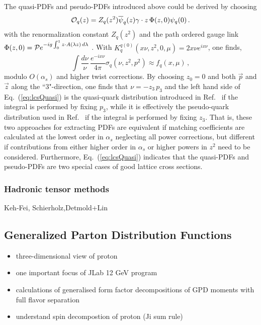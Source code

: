 The quasi-PDFs and pseudo-PDFs introduced above could be derived by choosing 
\begin{equation}
{\cal O}_{q}(z)=Z_q(z^2)\overline{\psi}_q(z)\gamma\cdot {z}\, \Phi(z,0){\psi}_q(0)\,.
\end{equation}
 with the renormalization constant $Z_q(z^2)$ and the path ordered gauge link $\Phi(z,0)={\cal P}e^{-ig\int_0^{1} z\cdot A(\lambda z)\,d\lambda}$ \cite{Ma:2017pxb}.  With $K^{q(0)}_{q}(x \nu,z^2,0,\mu)= 2 x \nu  e^{i x \nu}$, one finds,
\begin{equation}\label{eq:lcsQuasi}
\int \frac{d \nu}{\nu}\, \frac{e^{-i x \nu}}{4\pi} \sigma_{q}(\nu,z^2,p^2)\approx f_{q}(x,\mu)\, ,
\end{equation}
modulo $O(\alpha_s)$ and higher twist corrections.  By choosing $z_0=0$ and both $\vec{p}$ and $\vec{z}$ along the ``3"-direction, one finds that $\nu=-z_3\, p_3$ and the left hand side of Eq.~(\ref{eq:lcsQuasi}) is the quasi-quark distribution introduced in Ref.~\cite{Ji:2013dva} if the integral is performed by fixing $p_3$, while it is effectively the pseudo-quark distribution used in Ref.~\cite{Orginos:2017kos} if the integral is performed by fixing $z_3$. That is, these two approaches for extracting PDFs are equivalent if matching coefficients are calculated at the lowest order in $\alpha_s$ neglecting all power corrections, but different if contributions from either higher order in $\alpha_s$ or higher powers in $z^2$ need to be considered.
Furthermore, Eq.~(\ref{eq:lcsQuasi}) indicates that the quasi-PDFs and pseudo-PDFs are two special cases of good lattice cross sections. 

\subsubsection{Hadronic tensor methods}

Keh-Fei, Schierholz,Detmold+Lin


\subsection{Generalized Parton Distribution Functions}

\begin{itemize}
	\item three-dimensional view of proton
	\item one important focus of JLab 12 GeV program
	\item calculations of generalised form factor decompositions of GPD moments with full flavor separation
	\item understand spin decompostion of proton (Ji sum rule)
	
\end{itemize}

